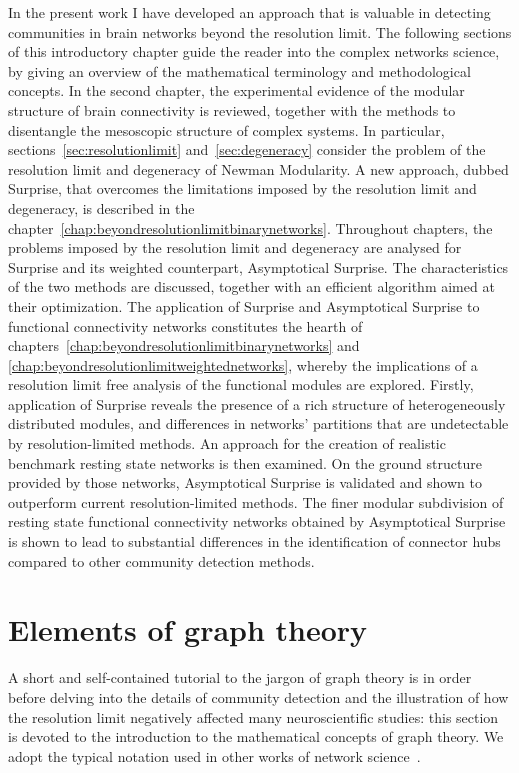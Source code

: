 In the present work I have developed an approach that is valuable in detecting communities in brain networks beyond the resolution limit.
The following sections of this introductory chapter guide the reader into the complex networks science, by giving an overview of the mathematical terminology and methodological concepts.
In the second chapter, the experimental evidence of the modular structure of brain connectivity is reviewed, together with the methods to disentangle the mesoscopic structure of complex systems. In particular, sections~\ref{sec:resolutionlimit} and~\ref{sec:degeneracy} consider the problem of the resolution limit and degeneracy of Newman Modularity.
A new approach, dubbed Surprise, that overcomes the limitations imposed by the resolution limit and degeneracy, is described in the chapter~\ref{chap:beyondresolutionlimitbinarynetworks}.
Throughout chapters, the problems imposed by the resolution limit and degeneracy are analysed for Surprise and its weighted counterpart, Asymptotical Surprise. The characteristics of the two methods are discussed, together with an efficient algorithm aimed at their optimization.
The application of Surprise and Asymptotical Surprise to functional connectivity networks constitutes the hearth of chapters~\ref{chap:beyondresolutionlimitbinarynetworks} and \ref{chap:beyondresolutionlimitweightednetworks}, whereby the implications of a resolution limit free analysis of the functional modules are explored.
Firstly, application of Surprise reveals the presence of a rich structure of heterogeneously distributed modules, and differences in networks' partitions that are undetectable by resolution-limited methods.
An approach for the creation of realistic benchmark resting state networks is then examined.
On the ground structure provided by those networks, Asymptotical Surprise is validated and shown to outperform current resolution-limited methods.
The finer modular subdivision of resting state functional connectivity networks obtained by Asymptotical Surprise is shown to lead to substantial differences in the identification of connector hubs compared to other community detection methods.


\section{Elements of graph theory}\label{sec:elementsofgraphtheory}
A short and self-contained tutorial to the jargon of graph theory is in order before delving into the details of community detection and the illustration of how the resolution limit negatively affected many neuroscientific studies: this section is devoted to the introduction to the mathematical concepts of graph theory.
We adopt the typical notation used in other works of network science~\cite{newman2010book,estrada2011}.

